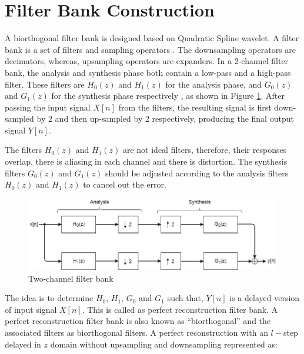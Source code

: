 \section{Filter Bank Construction}
A biorthogonal filter bank is designed based on Quadratic Spline wavelet. A filter bank is a set of filters and sampling operators \cite{strang1996wavelets}. The downsampling operators are decimators, whereas, upsampling operators are expanders. In a 2-channel filter bank, the analysis and synthesis phase both contain a low-pass and a high-pass filter. These filters are ${H_{0}(z)}$ and ${H_{1}(z)}$ for the analysis phase, and ${G_{0}(z)}$ and ${G_{1}(z)}$ for the synthesis phase respectively \cite{wang2001using}, as shown in Figure \ref{fig:2_channel_filter_bank}. After passing the input signal $X[n]$ from the filters, the resulting signal is first down-sampled by 2 and then up-sampled by 2 respectively, producing the final output signal $Y[n]$. 

The filters ${H_{0}(z)}$ and ${H_{1}(z)}$ are not ideal filters, therefore, their responses overlap, there is aliasing in each channel and there is distortion. The synthesis filters ${G_{0}(z)}$ and ${G_{1}(z)}$ should be adjusted according to the analysis filters ${H_{0}(z)}$ and ${H_{1}(z)}$ to cancel out the error.

\begin{figure}[h]
	\centering
	\includegraphics[width=160mm]{images/2_channel_filter_bank}
	\caption{Two-channel filter bank}
	\label{fig:2_channel_filter_bank}
\end{figure}



The idea is to determine $H_0$, $H_1$, $G_0$ and $G_1$ such that, $Y[n]$ is a delayed version of input signal $X[n]$. This is called as perfect reconstruction filter bank. A perfect reconstruction filter bank is also known as ``biorthogonal'' and the associated filters as biorthogonal filters. A perfect reconstruction with an $l-$step delayed in $z$ domain without upsampling and downsampling represented as:


